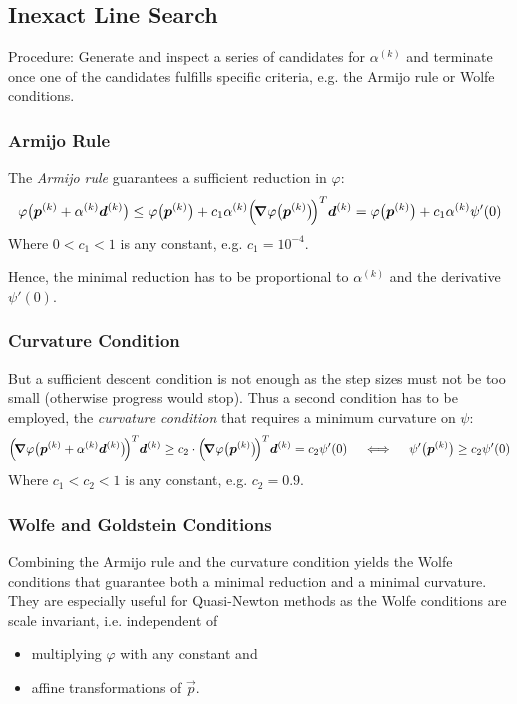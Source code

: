 		\subsection{Inexact Line Search}
			Procedure: Generate and inspect a series of candidates for \(\alpha^{(k)}\) and terminate once one of the candidates fulfills specific criteria, e.g. the Armijo rule or Wolfe conditions.

			\subsubsection{Armijo Rule}
				The \emph{Armijo rule} guarantees a sufficient reduction in \(\varphi\):
				\begin{align*}
					\varphi\big(\bm{p}^{(k)} + \alpha^{(k)} \bm{d}^{(k)}\big) \leq \varphi\big(\bm{p}^{(k)}\big) + c_1 \alpha^{(k)} \Big(\! \grad{\varphi}\big(\bm{p}^{(k)}\big) \!\Big)^T \bm{d}^{(k)} = \varphi\big(\bm{p}^{(k)}\big) + c_1 \alpha^{(k)} \psi'(0)
				\end{align*}
				Where \( 0 < c_1 < 1 \) is any constant, e.g. \( c_1 = 10^{-4} \).

				Hence, the minimal reduction has to be proportional to \(\alpha^{(k)}\) and the derivative \( \psi'(0) \).

			\subsubsection{Curvature Condition}
				But a sufficient descent condition is not enough as the step sizes must not be too small (otherwise progress would stop). Thus a second condition has to be employed, the \emph{curvature condition} that requires a minimum curvature on \(\psi\):
				\begin{align*}
					\Big(\!\grad{\varphi}\big(\bm{p}^{(k)} + \alpha^{(k)} \bm{d}^{(k)}\big)\!\Big)^T \bm{d}^{(k)} \geq c_2 \cdot \Big(\! \grad{\varphi}\big(\bm{p}^{(k)}\big) \!\Big)^T \bm{d}^{(k)} = c_2 \psi'(0) \quad\iff\quad \psi'\big(\bm{p}^{(k)}\big) \geq c_2 \psi'(0)
				\end{align*}
				Where \( c_1 < c_2 < 1 \) is any constant, e.g. \( c_2 = 0.9 \).

			\subsubsection{Wolfe and Goldstein Conditions}
				Combining the Armijo rule and the curvature condition yields the Wolfe conditions that guarantee both a minimal reduction and a minimal curvature. They are especially useful for Quasi-Newton methods as the Wolfe conditions are scale invariant, i.e. independent of
				\begin{itemize}
					\item multiplying \(\varphi\) with any constant and
					\item affine transformations of \(\vec{p}\).
				\end{itemize}

